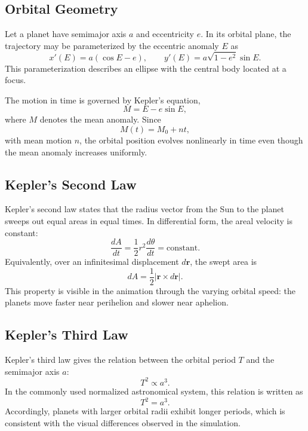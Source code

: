 \documentclass[12pt]{article}
\begin{document}
\subsection{Orbital Geometry}

Let a planet have semimajor axis \(a\) and eccentricity \(e\). In its orbital plane,
the trajectory may be parameterized by the eccentric anomaly \(E\) as
\begin{equation}
x'(E) = a(\cos E - e), 
\qquad
y'(E) = a\sqrt{1-e^2}\sin E.
\end{equation}
This parameterization describes an ellipse with the central body located at a focus.

The motion in time is governed by Kepler's equation,
\begin{equation}
M = E - e\sin E,
\end{equation}
where \(M\) denotes the mean anomaly. Since
\begin{equation}
M(t) = M_0 + nt,
\end{equation}
with mean motion \(n\), the orbital position evolves nonlinearly in time even
though the mean anomaly increases uniformly.

\subsection{Kepler's Second Law}

Kepler's second law states that the radius vector from the Sun to the planet sweeps
out equal areas in equal times. In differential form, the areal velocity is constant:
\begin{equation}
\frac{dA}{dt} = \frac{1}{2}r^2\frac{d\theta}{dt} = \text{constant}.
\end{equation}
Equivalently, over an infinitesimal displacement \(d\mathbf{r}\), the swept area is
\begin{equation}
dA = \frac{1}{2}\left|\mathbf{r} \times d\mathbf{r}\right|.
\end{equation}
This property is visible in the animation through the varying orbital speed:
the planets move faster near perihelion and slower near aphelion.

\subsection{Kepler's Third Law}

Kepler's third law gives the relation between the orbital period \(T\) and the
semimajor axis \(a\):
\begin{equation}
T^2 \propto a^3.
\end{equation}
In the commonly used normalized astronomical system, this relation is written as
\begin{equation}
T^2 = a^3.
\end{equation}
Accordingly, planets with larger orbital radii exhibit longer periods, which is
consistent with the visual differences observed in the simulation.
\end{document}
